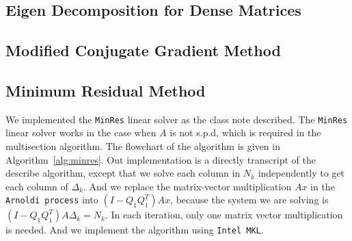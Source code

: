 \label{sec:implementation}
\subsection{Eigen Decomposition for Dense Matrices}

\subsection{Modified Conjugate Gradient Method}

\subsection{Minimum Residual Method}
We implemented the {\tt MinRes} linear solver as the class note described. The {\tt MinRes} linear solver works in the case when $A$ is not s.p.d, which is required in the multisection algorithm.  The flowchart of the algorithm is given in Algorithm~\ref{alg:minres}. Out implementation is a directly transcript of the describe algorithm, except that we solve each column in $N_k$ independently to get each column of $\Delta_k$. And we replace the matrix-vector multiplication $Ax$ in the {\tt Arnoldi process} into $(I-Q_1 Q_1^T)Ax$, because the system we are solving is $(I-Q_1 Q_1^T)A \Delta_k = N_k$. In each iteration, only one matrix vector multiplication is needed. And we implement the algorithm using {\tt Intel MKL}.

